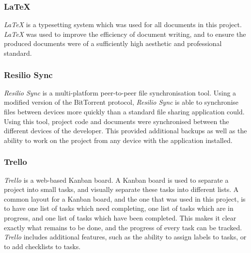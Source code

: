 \subsubsection{LaTeX \cite{latex}}
\textit{LaTeX} is a typesetting system which was used for all documents in this project. \textit{LaTeX} was used to improve the efficiency of document writing, and to ensure the produced documents were of a sufficiently high aesthetic and professional standard.

\subsubsection{Resilio Sync \cite{resilio_sync}}
\textit{Resilio Sync} is a multi-platform peer-to-peer file synchronisation tool. Using a modified version of the BitTorrent protocol, \textit{Resilio Sync} is able to synchronise files between devices more quickly than a standard file sharing application could. Using this tool, project code and documents were synchronised between the different devices of the developer. This provided additional backups as well as the ability to work on the project from any device with the application installed.

\subsubsection{Trello \cite{trello}}
\textit{Trello} is a web-based Kanban board. A Kanban board is used to separate a project into small tasks, and visually separate these tasks into different lists. A common layout for a Kanban board, and the one that was used in this project, is to have one list of tasks which need completing, one list of tasks which are in progress, and one list of tasks which have been completed. This makes it clear exactly what remains to be done, and the progress of every task can be tracked. \textit{Trello} includes additional features, such as the ability to assign labels to tasks, or to add checklists to tasks.



